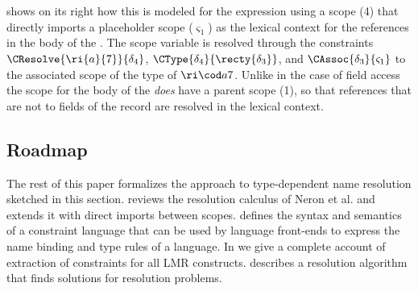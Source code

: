  shows on its right how this is modeled for the expression  using a scope (4) that directly imports a placeholder scope
($\varsigma_{1}$) as the lexical context for the references in the body of the
. The scope variable is resolved through the constraints
$\CResolve{\ri{a}{7}}{\delta_{4}}$, $\CType{\delta_{4}}{\recty{\delta_{3}}}$,
and $\CAssoc{\delta_{3}}{\varsigma_{1}}$ to the associated scope of the type of
$\ric{a}{7}$.
Unlike in the case of field access the scope for the body of the 
\emph{does} have a parent scope (1), so that references that are not to fields
of the record are resolved in the lexical context.

\subsection{Roadmap}

The rest of this paper formalizes the approach to type-dependent name resolution
sketched in this section.
 reviews the resolution calculus of Neron et al.
\cite{NeronTVW-ESOP-2015} and extends it with direct imports between scopes. 
 defines the syntax and semantics of a constraint
language that can be used by language front-ends to express the name binding and
type rules of a language. 
In  we give a complete account of
extraction of constraints for all LMR constructs. 
 describes a resolution algorithm that finds
solutions for resolution problems.

\endinput


\subsection{Name and Type Resolution}

explain scope graphs concepts: declarations, references, scopes, and imports

we show how type resolution is complementary to name resolution and can be
described using equality and subtype constraints on types and name resolution
constraints

we illustrate the interaction between name resolution and type resolution using
nominal record types, and the field access and with constructs

we show how the interaction is modeled using the extension of scope graphs with
direct (nameless) imports

separation of name resolution and typing

